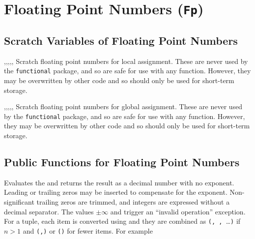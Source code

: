 \documentclass[oneside]{book}
\begin{document}
\chapter{Floating Point Numbers (\texttt{Fp})}

\section{Scratch Variables of Floating Point Numbers}

\begin{variable}{\lTmpaFp,\lTmpbFp,\lTmpcFp,\lTmpiFp,\lTmpjFp,\lTmpkFp}
Scratch floating point numbers for local assignment. These are never used by
the \verb!functional! package, and so are safe for use with any
function. However, they may be overwritten by other
code and so should only be used for short-term storage.
\end{variable}

\begin{variable}{\gTmpaFp,\gTmpbFp,\gTmpcFp,\gTmpiFp,\gTmpjFp,\gTmpkFp}
Scratch floating point numbers for global assignment. These are never used by
the \verb!functional! package, and so are safe for use with any
function. However, they may be overwritten by other
code and so should only be used for short-term storage.
\end{variable}

\section{Public Functions for Floating Point Numbers}

\begin{function}{\FpEval}
\begin{syntax}
 
\end{syntax}
Evaluates the  and returns the
result as a decimal number with no
exponent.  Leading or trailing zeros may be inserted to compensate
for the exponent.  Non-significant trailing zeros are trimmed, and
integers are expressed without a decimal separator.  The values
$\pm\infty$ and \nan{} trigger an \enquote{invalid operation}
exception.
For a tuple, each item is converted using  and they are combined as
\verb|(|\verb*|, |\verb*|, |\ldots{}\verb|)|
if $n>1$ and \verb|(|\verb|,)| or \verb|()| for fewer items.
For example
\begin{demohigh}
\end{demohigh}
\end{function}
\end{document}
